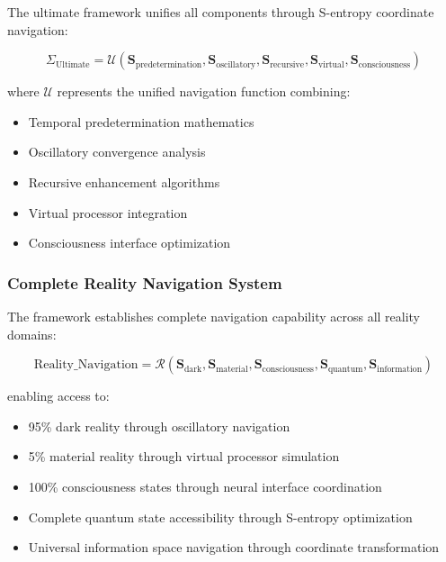 \documentclass[12pt,a4paper]{article}
\begin{document}
{{{{{{{{{{{{{{The ultimate framework unifies all components through S-entropy coordinate navigation:

\begin{equation}
\Sigma_{\text{Ultimate}} = \mathcal{U}(\mathbf{S}_{\text{predetermination}}, \mathbf{S}_{\text{oscillatory}}, \mathbf{S}_{\text{recursive}}, \mathbf{S}_{\text{virtual}}, \mathbf{S}_{\text{consciousness}})
\end{equation}

where $\mathcal{U}$ represents the unified navigation function combining:

\begin{itemize}
\item Temporal predetermination mathematics
\item Oscillatory convergence analysis
\item Recursive enhancement algorithms
\item Virtual processor integration
\item Consciousness interface optimization
\end{itemize}

\subsubsection{Complete Reality Navigation System}

The framework establishes complete navigation capability across all reality domains:

\begin{equation}
\text{Reality\_Navigation} = \mathcal{R}(\mathbf{S}_{\text{dark}}, \mathbf{S}_{\text{material}}, \mathbf{S}_{\text{consciousness}}, \mathbf{S}_{\text{quantum}}, \mathbf{S}_{\text{information}})
\end{equation}

enabling access to:

\begin{itemize}
\item 95\% dark reality through oscillatory navigation
\item 5\% material reality through virtual processor simulation
\item 100\% consciousness states through neural interface coordination
\item Complete quantum state accessibility through S-entropy optimization
\item Universal information space navigation through coordinate transformation
\end{itemize}

}}}}}}}}}}}}}}
\end{document}
